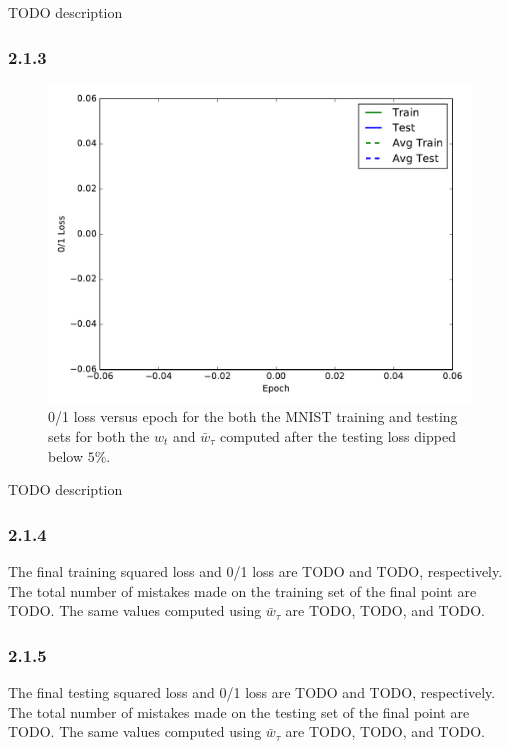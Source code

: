 \documentclass[12pt]{amsart}
\begin{document}
TODO description

\subsubsection*{2.1.3}

\begin{figure}[H]
	\includegraphics[width=\columnwidth]{pca_01_loss_masked.pdf}
    \caption{0/1 loss versus epoch for the both the MNIST training and testing sets for both the $w_t$ and $\bar{w}_{\tau}$ computed after the testing loss dipped below $5\%$.}
    \label{fig:pca_01_loss_masked}
\end{figure}

TODO description

\subsubsection*{2.1.4}

The final training squared loss and 0/1 loss are TODO and TODO, respectively.  The total number of mistakes made on the training set of the final point are TODO.  The same values computed using $\bar{w}_{\tau}$ are TODO, TODO, and TODO.

\subsubsection*{2.1.5}

The final testing squared loss and 0/1 loss are TODO and TODO, respectively.  The total number of mistakes made on the testing set of the final point are TODO.  The same values computed using $\bar{w}_{\tau}$ are TODO, TODO, and TODO.
\end{document}
